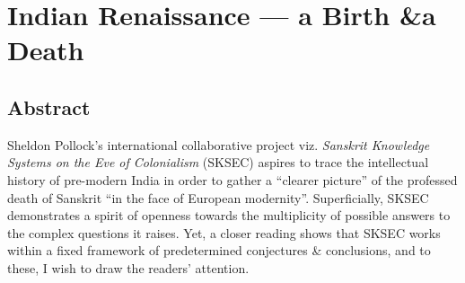 \chapter[Indian Renaissance — a Birth \& a Death]{Indian Renaissance — a Birth \&\break a Death}\label{chapter\thechapter:begin}



\smallskip
\section*{Abstract}
\smallskip

Sheldon Pollock’s international collaborative project viz. {\sl Sanskrit Knowledge Systems on the Eve of Colonialism} (SKSEC) aspires to trace the intellectual history of pre-modern India in order to gather a “clearer picture” of the professed death of Sanskrit “in the face of European modernity”. Superficially, SKSEC demonstrates a spirit of openness towards the multiplicity of possible answers to the complex questions it raises. Yet, a closer reading shows that SKSEC works within a fixed framework of predetermined conjectures \& conclusions, and to these, I wish to draw the readers’ attention. 

